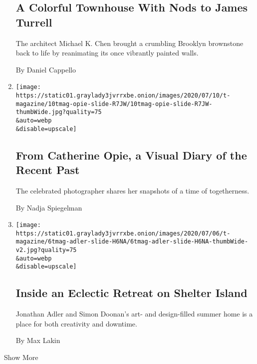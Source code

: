 \begin{enumerate}
  \hypertarget{a-colorful-townhouse-with-nods-to-james-turrell}{%
  \subsection{A Colorful Townhouse With Nods to James
  Turrell}\label{a-colorful-townhouse-with-nods-to-james-turrell}}

  The architect Michael K. Chen brought a crumbling Brooklyn brownstone
  back to life by reanimating its once vibrantly painted walls.

  By Daniel Cappello
\item
  \href{/2020/07/10/t-magazine/catherine-opie-photos.html}{}

  \texttt{[image: https://static01.graylady3jvrrxbe.onion/images/2020/07/10/t-magazine/10tmag-opie-slide-R7JW/10tmag-opie-slide-R7JW-thumbWide.jpg?quality=75\\\&auto=webp\\\&disable=upscale]}

  \hypertarget{from-catherine-opie-a-visual-diary-of-the-recent-past}{%
  \subsection{From Catherine Opie, a Visual Diary of the Recent
  Past}\label{from-catherine-opie-a-visual-diary-of-the-recent-past}}

  The celebrated photographer shares her snapshots of a time of
  togetherness.

  By Nadja Spiegelman
\item
  \href{/2020/07/10/t-magazine/jonathan-adler-simon-doonan-home.html}{}

  \texttt{[image: https://static01.graylady3jvrrxbe.onion/images/2020/07/06/t-magazine/6tmag-adler-slide-H6NA/6tmag-adler-slide-H6NA-thumbWide-v2.jpg?quality=75\\\&auto=webp\\\&disable=upscale]}

  \hypertarget{inside-an-eclectic-retreat-on-shelter-island}{%
  \subsection{Inside an Eclectic Retreat on Shelter
  Island}\label{inside-an-eclectic-retreat-on-shelter-island}}

  Jonathan Adler and Simon Doonan's art- and design-filled summer home
  is a place for both creativity and downtime.

  By Max Lakin
\end{enumerate}

Show More

